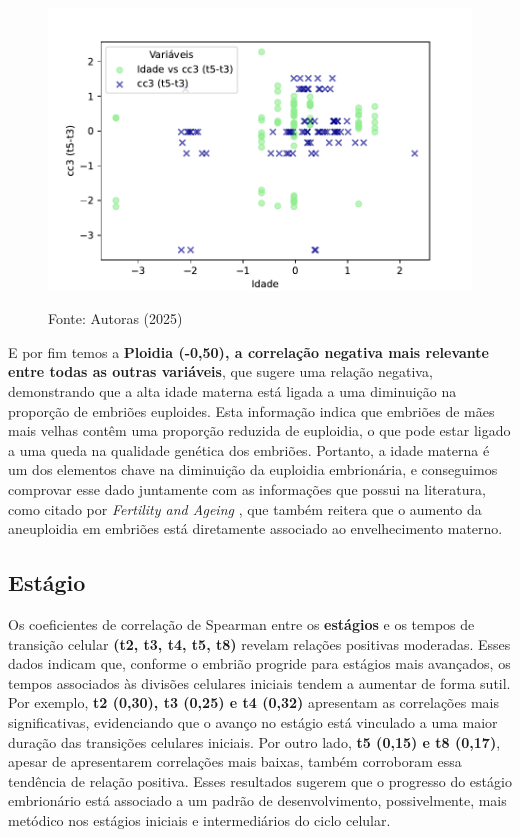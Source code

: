 \begin{figure}[h]
\begin{minipage}[b]{0.45\linewidth}
        \includegraphics[scale=0.35]{figuras/Spearman/idade-cc3.pdf}
        \vspace{0.3cm}
        \begin{minipage}{\linewidth}
            \centering
            \scriptsize{Fonte: Autoras (2025)}
        \end{minipage}
    \end{minipage}
\end{figure}
\FloatBarrier

E por fim temos a \textbf{Ploidia (-0,50), a correlação negativa mais relevante entre todas as outras variáveis}, que sugere uma relação negativa, demonstrando que a alta idade materna está ligada a uma diminuição na proporção de embriões euploides. Esta informação indica que embriões de mães mais velhas contêm uma proporção reduzida de euploidia, o que pode estar ligado a uma queda na qualidade genética dos embriões. Portanto, a idade materna é um dos elementos chave na diminuição da euploidia embrionária, e conseguimos comprovar esse dado juntamente com as informações que possui na literatura, como citado por \textit{Fertility and Ageing} \cite{eshre2005}, que também reitera que o aumento da aneuploidia em embriões está diretamente associado ao envelhecimento materno.

\subsection*{Estágio}
Os coeficientes de correlação de Spearman entre os \textbf{estágios} e os tempos de transição celular \textbf{(t2, t3, t4, t5, t8)} revelam relações positivas moderadas. Esses dados indicam que, conforme o embrião progride para estágios mais avançados, os tempos associados às divisões celulares iniciais tendem a aumentar de forma sutil. Por exemplo, \textbf{t2 (0,30), t3 (0,25) e t4 (0,32)} apresentam as correlações mais significativas, evidenciando que o avanço no estágio está vinculado a uma maior duração das transições celulares iniciais. Por outro lado, \textbf{t5 (0,15) e t8 (0,17)}, apesar de apresentarem correlações mais baixas, também corroboram essa tendência de relação positiva. Esses resultados sugerem que o progresso do estágio embrionário está associado a um padrão de desenvolvimento, possivelmente, mais metódico nos estágios iniciais e intermediários do ciclo celular.

